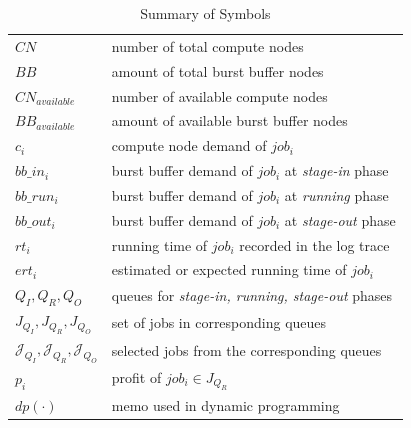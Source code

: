 \begin{table}[ht] 
        \renewcommand{\arraystretch}{1.3}
        \caption{Summary of Symbols}
        \label{Tab:Symbols}
        \centering
        \begin{tabular}{l|l}
                \hline
                $CN$ & number of total compute nodes \\
                $BB$ & amount of total burst buffer nodes \\
                $CN_{available}$ & number of available compute nodes \\
                $BB_{available}$ & amount of available burst buffer nodes \\
                $c_i$ & compute node demand of $job_i$ \\
                $bb\_in_i$ & burst buffer demand of $job_i$ at \textit{stage-in} phase \\
                $bb\_run_i$ & burst buffer demand of $job_i$ at \textit{running} phase \\
                $bb\_out_i$ & burst buffer demand of $job_i$ at \textit{stage-out} phase \\
                $rt_i$ & running time of $job_i$ recorded in the log trace \\
                $ert_i$ & estimated or expected running time of $job_i$ \\
                $Q_I, Q_R, Q_O$ & queues for \textit{stage-in, running, stage-out} phases \\
                $J_{Q_I}, J_{Q_R}, J_{Q_O}$ & set of jobs in corresponding queues \\
                $\mathcal{J}_{Q_I}, \mathcal{J}_{Q_R}, \mathcal{J}_{Q_O}$ & selected jobs from the corresponding queues\\
                $p_i$ & profit of $job_i \in J_{Q_R}$ \\
                $dp(\cdot)$ & memo used in dynamic programming \\
                \hline
        \end{tabular}
\end{table}


